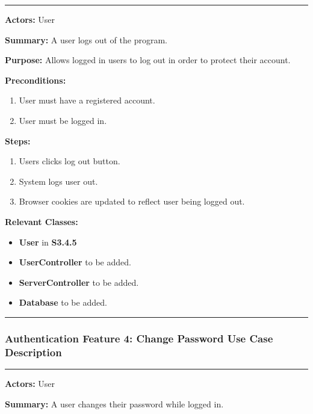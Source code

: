 \documentclass[twoside,letterpaper]{article}
\begin{document}
	\hrule
	\vspace{8pt}
	\noindent\textbf{Actors:} User \newline
	
	\noindent\textbf{Summary:} A user logs out of the program.  \newline
	
	\noindent\textbf{Purpose:} Allows logged in users to log out in order to protect their account.  \newline
	
	\noindent\textbf{Preconditions:}
	\begin{enumerate}
		\item User must have a registered account.
		\item User must be logged in.
	\end{enumerate}
	
	\noindent\textbf{Steps:}
	\begin{enumerate}
		\item Users clicks log out button.
		\item System logs user out.
		\item Browser cookies are updated to reflect user being logged out.
	\end{enumerate}
	
	\noindent\textbf{Relevant Classes:}
	\begin{itemize}
		\item \textbf{User} in \textbf{S3.4.5}
		\item \textbf{UserController} to be added.
		\item \textbf{ServerController} to be added.
		\item \textbf{Database} to be added.
	\end{itemize}
	\vspace{8pt}
	\hrule
	\newpage
	
	\subsubsection[Authentication Feature 4: Change Password Use Case Description]{\rmfamily\bfseries\color{black}
		Authentication Feature 4: Change Password Use Case Description}
		\label{a:uc4}
	\hypertarget{RefHeading22059017292}{}
	
	\hrule
	\vspace{8pt}
	\noindent\textbf{Actors:} User \newline
	
	\noindent\textbf{Summary:} A user changes their password while logged in.  \newline
	
\end{document}
